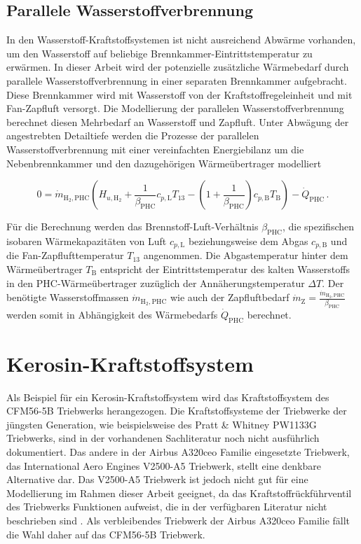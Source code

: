 \subsection{Parallele Wasserstoffverbrennung}

In den Wasserstoff-Kraftstoffsystemen ist nicht ausreichend Abwärme vorhanden, um den Wasserstoff auf beliebige Brennkammer-Eintrittstemperatur zu erwärmen. In dieser Arbeit wird der potenzielle zusätzliche Wärmebedarf durch parallele Wasserstoffverbrennung in einer separaten Brennkammer aufgebracht. Diese Brennkammer wird mit Wasserstoff von der Kraftstoffregeleinheit und mit Fan-Zapfluft versorgt. Die Modellierung der parallelen Wasserstoffverbrennung berechnet diesen Mehrbedarf an Wasserstoff und Zapfluft. Unter Abwägung der angestrebten Detailtiefe werden die Prozesse der parallelen Wasserstoffverbrennung mit einer vereinfachten Energiebilanz um die Nebenbrennkammer und den dazugehörigen Wärmeübertrager modelliert 

\begin{equation}\label{Eq:phc}
	0 = \dot{m}_{\mathrm{H}_2, \mathrm{PHC}}\left(H_{u, \mathrm{H}_2} + \frac{1}{\beta_\mathrm{PHC}}c_{p,\mathrm{L}} T_{13} - \left(1+\frac{1}{\beta_\mathrm{PHC}}\right)c_{p,\mathrm{B}} T_\mathrm{B}\right)-\dot{Q}_\mathrm{PHC}\,.
\end{equation}

Für die Berechnung werden das Brennstoff-Luft-Verhältnis $\beta_\mathrm{PHC}$, die spezifischen isobaren Wärmekapazitäten von Luft $c_{p,\mathrm{L}}$ beziehungsweise dem Abgas $c_{p,\mathrm{B}}$ und die Fan-Zapflufttemperatur $T_{13}$ angenommen. Die Abgastemperatur hinter dem Wärmeübertrager $T_\mathrm{B}$ entspricht der Eintrittstemperatur des kalten Wasserstoffs in den PHC-Wärmeübertrager zuzüglich der Annäherungstemperatur $\Delta T$. Der benötigte Wasserstoffmassen $\dot{m}_{\mathrm{H}_2, \mathrm{PHC}}$ wie auch der Zapfluftbedarf $\dot{m}_\mathrm{Z} = \frac{\dot{m}_{\mathrm{H}_2, \mathrm{PHC}}}{\beta_\mathrm{PHC}}$ werden somit in Abhängigkeit des Wärmebedarfs $\dot{Q}_\mathrm{PHC}$ berechnet.

\section{Kerosin-Kraftstoffsystem}

Als Beispiel für ein Kerosin-Kraftstoffsystem wird das Kraftstoffsystem des CFM56-5B Triebwerks herangezogen. Die Kraftstoffsysteme der Triebwerke der jüngsten Generation, wie beispielsweise des Pratt \& Whitney PW1133G Triebwerks, sind in der vorhandenen Sachliteratur noch nicht ausführlich dokumentiert. Das andere in der Airbus A320ceo Familie eingesetzte Triebwerk, das International Aero Engines V2500-A5 Triebwerk, stellt eine denkbare Alternative dar. Das V2500-A5 Triebwerk ist jedoch nicht gut für eine Modellierung im Rahmen dieser Arbeit geeignet, da das Kraftstoffrückführventil des Triebwerks Funktionen aufweist, die in der verfügbaren Literatur nicht beschrieben sind \cite{LinkeDiesinger.2014}. Als verbleibendes Triebwerk der Airbus A320ceo Familie fällt die Wahl daher auf das CFM56-5B Triebwerk. 

